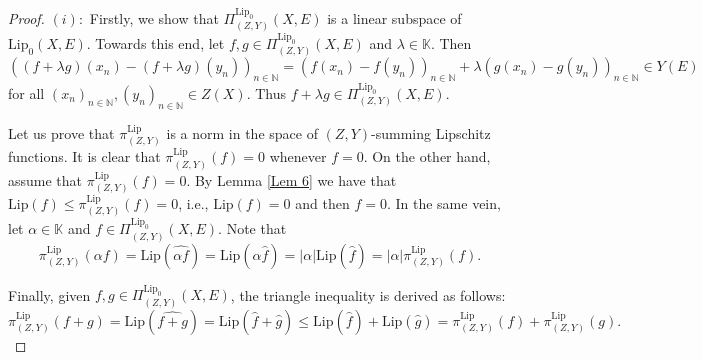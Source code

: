 \documentclass[12pt]{amsart}
\def\N{\mathbb{N}}
\def\Lip{\mathrm{Lip}_0}
\def\Lipnorm{\mathrm{Lip}}
\begin{document}
\begin{proof}
	$(i):$ Firstly, we show that $\Pi_{(Z,Y)}^{\Lip}(X,E)$ is a linear subspace of $\Lip(X,E)$. Towards this end, let $f,g \in \Pi_{(Z,Y)}^{\Lip}(X,E)$ and $\lambda \in \mathbb{K}$. Then
	$$
	((f+\lambda g)(x_n)-(f+\lambda g)(y_n))_{n\in\N} = (f(x_n)-f(y_n))_{n\in\N} +\lambda (g(x_n)-g(y_n))_{n\in\N} \in Y(E)
	$$
	for all $(x_n)_{n\in\N},(y_n)_{n\in\N} \in Z(X)$. Thus $f+\lambda g \in \Pi_{(Z,Y)}^{\Lip}(X,E)$.

	Let us prove that $\pi_{(Z,Y)}^{\Lipnorm}$ is a norm in the space of $(Z,Y)$-summing Lipschitz functions. It is clear that $\pi_{(Z,Y)}^{\Lipnorm}(f)=0$ whenever $f=0$. On the other hand, assume that $\pi_{(Z,Y)}^{\Lipnorm}(f)=0$. By Lemma \ref{Lem 6} we have that $\Lipnorm(f) \leq \pi_{(Z,Y)}^{\Lipnorm}(f)=0$, i.e., $\Lipnorm(f)=0$ and then $f=0$. In the same vein, let $\alpha \in \mathbb{K}$ and $f\in \Pi_{(Z,Y)}^{\Lip}(X,E)$. Note that
	$$
	\pi_{(Z,Y)}^{\Lipnorm}(\alpha f) = \Lipnorm(\widehat{\alpha f}) = \Lipnorm(\alpha \hat{f}) = |\alpha|\Lipnorm(\hat{f})= |\alpha|\pi_{(Z,Y)}^{\Lipnorm}(f).
	$$

	Finally, given $f,g \in \Pi_{(Z,Y)}^{\Lip}(X,E)$, the triangle inequality is derived as follows:
	$$
	\pi_{(Z,Y)}^{\Lipnorm}(f+g) = \Lipnorm(\widehat{f+g}) = \Lipnorm(\hat{f}+\hat{g}) \leq \Lipnorm(\hat{f})+\Lipnorm(\hat{g}) = \pi_{(Z,Y)}^{\Lipnorm}(f)+\pi_{(Z,Y)}^{\Lipnorm}(g).
	$$


\end{proof}
\end{document}
